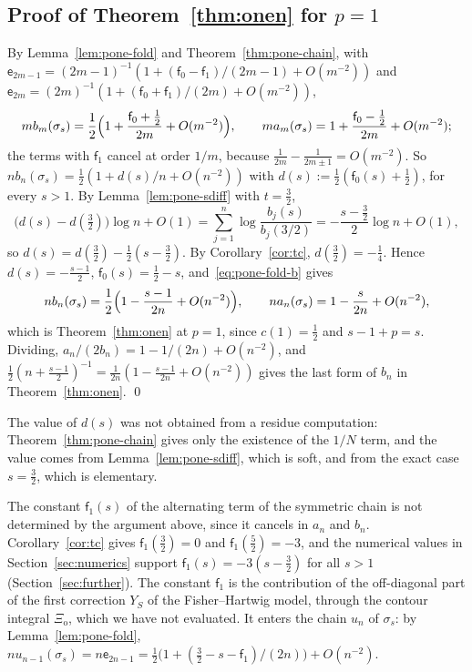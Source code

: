 \subsection{\texorpdfstring{Proof of Theorem~\ref{thm:onen} for $p=1$}{Proof of Theorem 1.4 for p=1}}\label{sec:pone-proof}

By Lemma~\ref{lem:pone-fold} and Theorem~\ref{thm:pone-chain}, with $\mathsf e_{2m-1}=(2m-1)^{-1}(1+(\mathsf f_0-\mathsf f_1)/(2m-1)
+O(m^{-2}))$ and $\mathsf e_{2m}=(2m)^{-1}(1+(\mathsf f_0+\mathsf f_1)/(2m)+O(m^{-2}))$,
\begin{equation}\label{eq:pone-fold-b}
  mb_m(\sigma_s)=\frac12\Bigl(1+\frac{\mathsf f_0+\frac12}{2m}+O(m^{-2})\Bigr),\qquad
  ma_m(\sigma_s)=1+\frac{\mathsf f_0-\frac12}{2m}+O(m^{-2});
\end{equation}
the terms with $\mathsf f_1$ cancel at order $1/m$, because $\frac1{2m}-\frac1{2m\pm1}=O(m^{-2})$. So $nb_n(\sigma_s)=
\frac12(1+d(s)/n+O(n^{-2}))$ with $d(s):=\frac12(\mathsf f_0(s)+\frac12)$, for every $s>1$. By Lemma~\ref{lem:pone-sdiff} with
$t=\frac32$,
\[
  \bigl(d(s)-d(\tfrac32)\bigr)\log n+O(1)=\sum_{j=1}^n\log\frac{b_j(s)}{b_j(3/2)}=-\frac{s-\frac32}2\log n+O(1),
\]
so $d(s)=d(\frac32)-\frac12(s-\frac32)$. By Corollary~\ref{cor:tc}, $d(\frac32)=-\frac14$. Hence $d(s)=-\frac{s-1}2$,
$\mathsf f_0(s)=\frac12-s$, and~\eqref{eq:pone-fold-b} gives
\begin{equation}\label{eq:pone-fold-a}
  nb_n(\sigma_s)=\frac12\Bigl(1-\frac{s-1}{2n}+O(n^{-2})\Bigr),\qquad na_n(\sigma_s)=1-\frac s{2n}+O(n^{-2}),
\end{equation}
which is Theorem~\ref{thm:onen} at $p=1$, since $c(1)=\frac12$ and $s-1+p=s$. Dividing,
$a_n/(2b_n)=1-1/(2n)+O(n^{-2})$, and $\frac12(n+\frac{s-1}2)^{-1}=\frac1{2n}(1-\frac{s-1}{2n}+O(n^{-2}))$ gives the last form of
$b_n$ in Theorem~\ref{thm:onen}. \qed

The value of $d(s)$ was not obtained from a residue computation: Theorem~\ref{thm:pone-chain} gives only the existence
of the $1/N$ term, and the value comes from Lemma~\ref{lem:pone-sdiff}, which is soft, and from the exact case
$s=\frac32$, which is elementary.

\begin{remark}\label{rem:pone-odd}
The constant $\mathsf f_1(s)$ of the alternating term of the symmetric chain is not determined by the argument above,
since it cancels in $a_n$ and $b_n$. Corollary~\ref{cor:tc} gives $\mathsf f_1(\frac32)=0$ and $\mathsf f_1(\frac52)=-3$,
and the numerical values in Section~\ref{sec:numerics} support $\mathsf f_1(s)=-3(s-\frac32)$ for all $s>1$
(Section~\ref{sec:further}). The constant $\mathsf f_1$ is the contribution of the off-diagonal part of the first correction
$Y_S$ of the Fisher--Hartwig model, through the contour integral $\Xi_{\mathrm o}$, which we have not evaluated. It enters
the chain $u_n$ of $\sigma_s$: by Lemma~\ref{lem:pone-fold},
$nu_{n-1}(\sigma_s)=n\mathsf e_{2n-1}=\frac12\bigl(1+(\frac32-s-\mathsf f_1)/(2n)\bigr)+O(n^{-2})$.
\end{remark}

